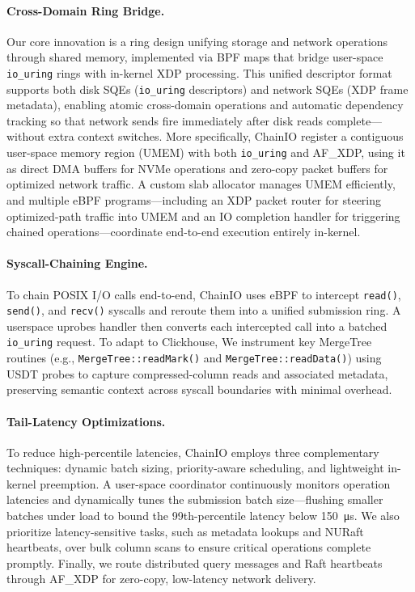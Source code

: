 \documentclass[sigconf,10pt]{acmart}
\newcommand{\sys}{ChainIO\xspace}
\begin{document}
\paragraph{Cross-Domain Ring Bridge.} Our core innovation is a ring design unifying storage and network operations through shared memory, implemented via BPF maps that bridge user-space \texttt{io\_uring} rings with in-kernel XDP processing. This unified descriptor format supports both disk SQEs (\texttt{io\_uring} descriptors) and network SQEs (XDP frame metadata), enabling atomic cross-domain operations and automatic dependency tracking so that network sends fire immediately after disk reads complete—without extra context switches. More specifically, \sys register a contiguous user-space memory region (UMEM) with both \texttt{io\_uring} and AF\_XDP, using it as direct DMA buffers for NVMe operations and zero-copy packet buffers for optimized network traffic. A custom slab allocator manages UMEM efficiently, and multiple eBPF programs—including an XDP packet router for steering optimized-path traffic into UMEM and an IO completion handler for triggering chained operations—coordinate end-to-end execution entirely in-kernel.


\paragraph{Syscall-Chaining Engine.} To chain POSIX I/O calls end-to-end, \sys uses eBPF to intercept \texttt{read()}, \texttt{send()}, and \texttt{recv()} syscalls and reroute them into a unified submission ring. A userspace uprobes\cite{zheng2023bpftime} handler then converts each intercepted call into a batched \texttt{io\_uring} request. To adapt to Clickhouse, We instrument key MergeTree routines (e.g., \texttt{MergeTree::readMark()} and \texttt{MergeTree::readData()}) using USDT probes to capture compressed-column reads and associated metadata, preserving semantic context across syscall boundaries with minimal overhead.

\paragraph{Tail-Latency Optimizations.} To reduce high-percentile latencies, \sys employs three complementary techniques: dynamic batch sizing, priority-aware scheduling, and lightweight in-kernel preemption. A user-space coordinator continuously monitors operation latencies and dynamically tunes the submission batch size—flushing smaller batches under load to bound the 99th-percentile latency below \SI{150}{\micro\second}. We also prioritize latency-sensitive tasks, such as metadata lookups and NURaft heartbeats, over bulk column scans to ensure critical operations complete promptly. Finally, we route distributed query messages and Raft heartbeats through AF\_XDP for zero-copy, low-latency network delivery.
\end{document}
